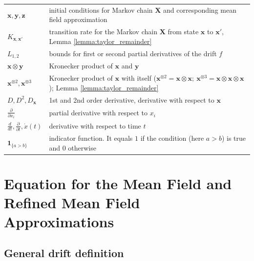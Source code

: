 \documentclass[acmsmall]{acmart}
\newcommand\bx{\mathbf{x}}
\newcommand\bX{\mathbf{X}}
\newcommand\by{\mathbf{y}}
\newcommand\bz{\mathbf{z}}
\newcommand\bdrift{f}
\begin{document}
\begin{center}
\begin{tabular}{l l}
$\bx, \by, \bz$ & initial conditions for Markov chain $\bX$ and corresponding mean field approximation \\
$K_{\bx,\bx'}$ & transition rate for the Markov chain $\bX$ from state $\bx$ to $\bx'$, Lemma \ref{lemma:taylor_remainder} \\
$L_{1, 2}$ & bounds for first or second partial derivatives of the drift $\bdrift$ \\
$ \bx \otimes\by $ & Kronecker product of $\bx$ and $\by$ \\
$\bx^{\otimes2}, \bx^{\otimes3}$ & Kronecker product of $\bx$ with itself ($\bx^{\otimes2} = \bx \otimes\bx; \  \bx^{\otimes3} = \bx \otimes\bx\otimes\bx$); Lemma \ref{lemma:taylor_remainder} \\
$D, D^2, D_{\bx}$ & 1st and 2nd order derivative, derivative with respect to $\bx$ \\
$ \frac{\partial }{\partial x_i} $ & partial derivative with respect to $x_i$ \\
$ \frac{d }{dt}, \frac{\partial }{\partial t}, \dot{x}(t)$ & derivative with respect to time $t$ \\
$ \mathbf{1}_{\{ a>b \}} $ & indicator function. It equals $1$ if the condition (here $a>b$) is true and $0$ otherwise
\end{tabular}
\end{center}


\section{Equation for the Mean Field and Refined Mean Field Approximations} 
\color{myorange}


\subsection{General drift definition}
\label{apx:drift_def}
\end{document}
